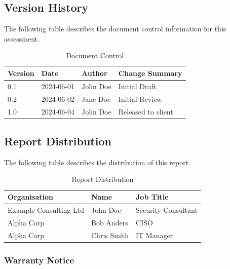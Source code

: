 \documentclass[11pt]{article}
\begin{document}
\subsection{Version History}

The following table describes the document control information for this assessment.

\begin{table}[h]
\centering
\begin{tabular}{|l|l|l|l|}
\hline
\textbf{Version} & \textbf{Date} & \textbf{Author} & \textbf{Change Summary} \\ \hline
0.1 & 2024-06-01 & John Doe & Initial Draft \\ \hline
0.2 & 2024-06-02 & Jane Doe & Initial Review \\ \hline
1.0 & 2024-06-04 & John Doe & Released to client \\ \hline
\end{tabular}
\caption{Document Control}
\end{table}


\lipsum[123]

\pagebreak

\subsection{Report Distribution}

The following table describes the distribution of this report.

\lipsum[124]

\begin{table}[h]
\centering
\begin{tabular}{|l|l|l|}
\hline
\textbf{Organisation} & \textbf{Name} & \textbf{Job Title} \\ \hline
Example Consulting Ltd & John Doe & Security Consultant \\ \hline
Alpha Corp & Bob Anders & CISO \\ \hline
Alpha Corp & Chris Smith & IT Manager \\ \hline
\end{tabular}
\caption{Report Distribution}
\end{table}

\newpage

\subsubsection{Warranty Notice}

\lipsum[125]
\vspace{6pt}
\lipsum[125]
\end{document}

